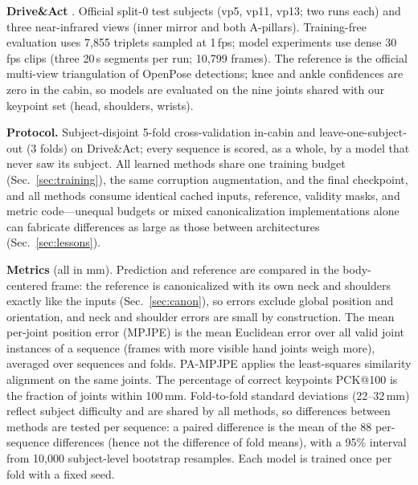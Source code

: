\documentclass[journal]{IEEEtran}
\newcommand{\da}{Drive\&Act}
\begin{document}
\textbf{\da{}} \cite{martin2019drive}. Official split-0 test subjects (vp5, vp11, vp13; two runs each) and three near-infrared views (inner mirror and both A-pillars). Training-free evaluation uses 7{,}855 triplets sampled at 1\,fps; model experiments use dense 30\,fps clips (three 20\,s segments per run; 10{,}799 frames). The reference is the official multi-view triangulation of OpenPose \cite{cao2021openpose} detections; knee and ankle confidences are zero in the cabin, so models are evaluated on the nine joints shared with our keypoint set (head, shoulders, wrists).

\textbf{Protocol.} Subject-disjoint 5-fold cross-validation in-cabin and leave-one-subject-out (3 folds) on \da{}; every sequence is scored, as a whole, by a model that never saw its subject. All learned methods share one training budget (Sec.~\ref{sec:training}), the same corruption augmentation, and the final checkpoint, and all methods consume identical cached inputs, reference, validity masks, and metric code---unequal budgets or mixed canonicalization implementations alone can fabricate differences as large as those between architectures (Sec.~\ref{sec:lessons}).

\textbf{Metrics} (all in mm). Prediction and reference are compared in the body-centered frame: the reference is canonicalized with its own neck and shoulders exactly like the inputs (Sec.~\ref{sec:canon}), so errors exclude global position and orientation, and neck and shoulder errors are small by construction. The mean per-joint position error (MPJPE) is the mean Euclidean error over all valid joint instances of a sequence (frames with more visible hand joints weigh more), averaged over sequences and folds. PA-MPJPE applies the least-squares similarity alignment \cite{umeyama1991least} on the same joints. The percentage of correct keypoints PCK@100 is the fraction of joints within 100\,mm. Fold-to-fold standard deviations (22--32\,mm) reflect subject difficulty and are shared by all methods, so differences between methods are tested per sequence: a paired difference is the mean of the 88 per-sequence differences (hence not the difference of fold means), with a 95\% interval from 10{,}000 subject-level bootstrap resamples. Each model is trained once per fold with a fixed seed.
\end{document}
